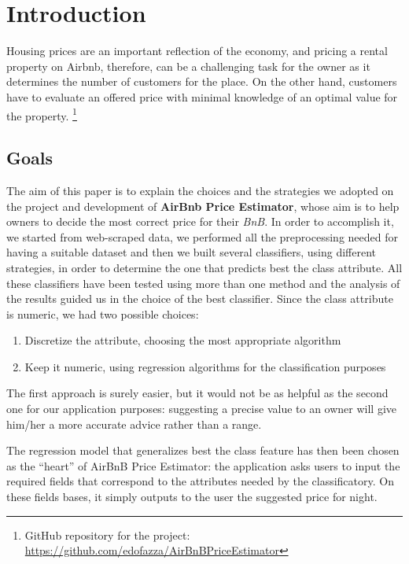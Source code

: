 \section{Introduction}
Housing prices are an important reflection of the economy, and pricing a rental property on Airbnb, therefore, can be a challenging task for the owner as it determines the number of customers for the place. On the other hand, customers have to evaluate an offered price with minimal knowledge of an optimal value for the property.
\footnote{GitHub repository for the project: \url{https://github.com/edofazza/AirBnBPriceEstimator}}

\subsection{Goals}
The aim of this paper is to explain the choices and the strategies we adopted on the project and development of \textbf{AirBnb Price Estimator}, whose aim is to help owners to decide the most correct price for their \textit{BnB}. 
In order to accomplish it, we started from web-scraped data, we performed all the preprocessing needed for having a suitable dataset and then we built several classifiers, using different strategies, in order to determine the one that predicts best the class attribute. All these classifiers have been tested using more than one method and the analysis of the results guided us in the choice of the best classifier.
Since the class attribute is numeric, we had two possible choices:

\begin{enumerate}
	\item Discretize the attribute, choosing the most appropriate algorithm
	\item Keep it numeric, using regression algorithms for the classification purposes
\end{enumerate}
The first approach is surely easier, but it would not be as helpful as the second one for our application purposes: suggesting a precise value to an owner will give him/her a more accurate advice rather than a range.

The regression model that generalizes best the class feature has then been chosen as the “heart” of AirBnB Price Estimator: the application asks users to input the required fields that correspond to the attributes needed by the classificatory. On these fields bases, it simply outputs to the user the suggested price for night.

